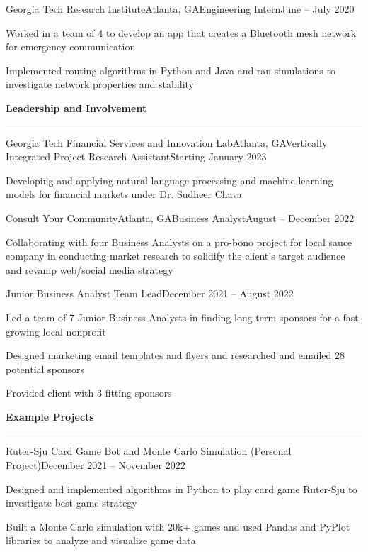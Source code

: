\documentclass{article}
\newcommand{\horizontal}{\vspace{3pt}\hrule}
\newcommand{\sectitle}[1]{\vspace{3pt} \textbf{\large #1} \horizontal}
\begin{document}
\begin{flushleft}
    \begin{experience}{Georgia Tech Research Institute}{Atlanta, GA}{Engineering Intern}{June -- July 2020}
        \item Worked in a team of 4 to develop an app that creates a Bluetooth mesh network for emergency communication
        \item Implemented routing algorithms in Python and Java and ran simulations to investigate network properties and stability
    \end{experience}


\sectitle{Leadership and Involvement}

    \begin{experience}{Georgia Tech Financial Services and Innovation Lab}{Atlanta, GA}{Vertically Integrated Project Research Assistant}{Starting January 2023}
        \item Developing and applying natural language processing and machine learning models for financial markets under Dr. Sudheer Chava
    \end{experience}

    \begin{experience}{Consult Your Community}{Atlanta, GA}{Business Analyst}{August -- December 2022}
        \item Collaborating with four Business Analysts on a pro-bono project for local sauce company in conducting market research to solidify the client's target audience and revamp web/social media strategy
    \end{experience}
    \begin{subexperience}{Junior Business Analyst Team Lead}{December 2021 -- August 2022}
        \item Led a team of 7 Junior Business Analysts in finding long term sponsors for a fast-growing local nonprofit
        \item Designed marketing email templates and flyers and researched and emailed 28 potential sponsors
        \item Provided client with 3 fitting sponsors
    \end{subexperience}

\sectitle{Example Projects}

    \begin{subexperience}{Ruter-Sju Card Game Bot and Monte Carlo Simulation (Personal Project)}{December 2021 -- November 2022}
        \item Designed and implemented algorithms in Python to play card game Ruter-Sju to investigate best game strategy
        \item Built a Monte Carlo simulation with 20k+ games and used Pandas and PyPlot libraries to analyze and visualize game data
    \end{subexperience}


\end{flushleft}
\end{document}
